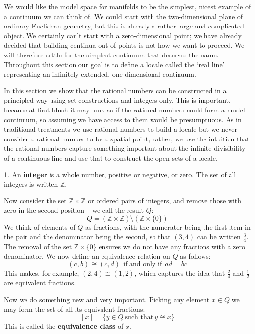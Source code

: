 \documentclass[oneside,english]{amsbook}
\numberwithin{section}{chapter}
\theoremstyle{plain}
\theoremstyle{definition}
\newtheorem{defn}[thm]{\protect\definitionname}
\providecommand{\definitionname}{Definition}
\begin{document}
We would like the model space for manifolds to be the simplest, nicest example of a continuum we can think of. We could start with the two-dimensional plane of ordinary Euclidean geometry, but this is already a rather large and complicated object. We certainly can't start with a zero-dimensional point; we have already decided that building continua out of points is not how we want to proceed. We will therefore settle for the simplest continuum that deserves the name. Throughout this section our goal is to define a locale called the `real line' representing an infinitely extended, one-dimensional continuum. 

In this section we show that the rational numbers can be constructed in a principled way using set constructions and integers only. This is important, because at first blush it may look as if the rational numbers could form a model continuum, so assuming we have access to them would be presumptuous. As in traditional treatments we use rational numbers to build a locale but we never consider a rational number to be a spatial point; rather, we use the intuition that the rational numbers capture something important about the infinite divisibility of a continuous line and use that to construct the open sets of a locale.

\begin{defn}
	An \textbf{integer} is a whole number, positive or negative, or zero. The set of all integers is written $\mathbb{Z}$.
\end{defn}

Now consider the set $\mathbb{Z}\times\mathbb{Z}$ or ordered pairs of integers, and remove those with zero in the second position -- we call the result $Q$:
\[
	Q = (\mathbb{Z}\times\mathbb{Z})\setminus (\mathbb{Z}\times\{0\})
\]
We think of elements of $Q$ as fractions, with the numerator being the first item in the pair and the denominator being the second, so that $(3,4)$ can be written $\frac{3}{4}$. The removal of the set $\mathbb{Z}\times\{0\}$ ensures we do not have any fractions with a zero denominator. We now define an equivalence relation on $Q$ as follows:
\[
	(a,b)\cong (c,d)\ \ \text{if and only if} \ \ ad = bc
\]
This makes, for example, $(2,4)\cong (1,2)$, which captures the idea that $\frac{2}{4}$ and $\frac{1}{2}$ are equivalent fractions.

Now we do something new and very important. Picking any element $x\in Q$ we may form the set of all its equivalent fractions:
\[
	[x] = \{y\in Q \ \text{such that}\ y\cong x\}
\]
This is called the \textbf{equivalence class} of $x$. 
\end{document}
